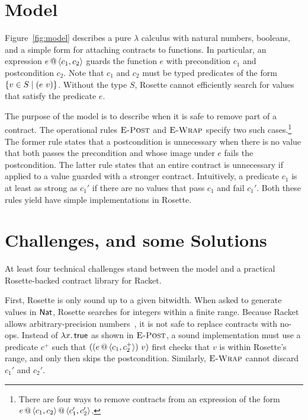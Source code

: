 \documentclass[preprint,9pt]{sigplanconf}
\begin{document}
\section{Model}

Figure~\ref{fig:model} describes a pure $\lambda$ calculus with natural numbers, booleans, and a simple form for attaching contracts to functions.
In particular, an expression $e\,@\,\langle c_1,c_2 \rangle$ guards the function $e$ with precondition $c_1$ and postcondition $c_2$.
Note that $c_1$ and $c_2$ must be typed predicates of the form $\{ v \in S \mid (e~v) \}$.
Without the type $S$, Rosette cannot efficiently search for values that satisfy the predicate $e$.

The purpose of the model is to describe when it is safe to remove part of a contract.
The operational rules $\textsc{E-Post}$ and $\textsc{E-Wrap}$ specify two such cases.\footnote{There are four ways to remove contracts from an expression of the form $e\,@\,\langle c_1,c_2 \rangle\,@\,\langle c_1',c_2' \rangle$.}
The former rule states that a postcondition is unnecessary when there is no value that both passes the precondition and whose image under $e$ fails the postcondition.
The latter rule states that an entire contract is unnecessary if applied to a value guarded with a stronger contract.
Intuitively, a predicate $c_1$ is at least as strong as $c_1'$ if there are no values that pass $c_1$ and fail $c_1'$.
Both these rules yield have simple implementations in Rosette.


\section{Challenges, and some Solutions}

At least four technical challenges stand between the model and a practical Rosette-backed contract library for Racket.

First, Rosette is only sound up to a given bitwidth.
When asked to generate values in $\mathsf{Nat}$, Rosette searches for integers within a finite range.
Because Racket allows arbitrary-precision numbers~\cite{stff-padl-2012}, it is not safe to replace contracts with no-ops.
Instead of $\lambda x.\,\mathsf{true}$ as shown in $\textsc{E-Post}$, a sound implementation must use a predicate $c^+$ such that $((e\,@\,\langle c_1,c_2^+ \rangle)~v)$ first checks that $v$ is within Rosette's range, and only then skips the postcondition.
Similarly, $\textsc{E-Wrap}$ cannot discard $c_1'$ and $c_2'$.
\end{document}
